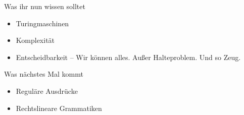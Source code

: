 \begin{frame}	
	\begin{block}{Was ihr nun wissen solltet}
		\begin{itemize}
			\item Turingmaschinen
			\item Komplexität
			\item Entscheidbarkeit -- Wir können alles. Außer Halteproblem. Und so Zeug.
		\end{itemize}
	\end{block}
	
	\begin{block}{Was nächstes Mal kommt}
		\begin{itemize}
			\item Reguläre Ausdrücke
			\item Rechtslineare Grammatiken
		\end{itemize}
	\end{block}
\end{frame}


{}

\slideThanks

